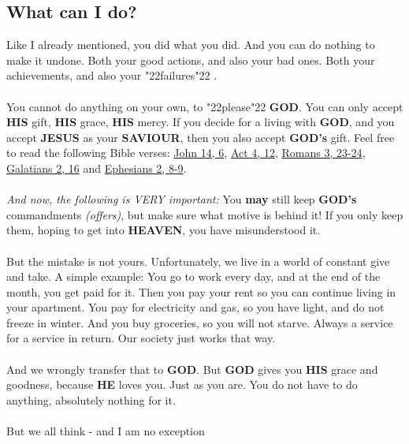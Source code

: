 \documentclass[12pt,a5paper]{article}
\newcommand{\God}[0]{\textbf{GOD}}
\newcommand{\Gods}[0]{\textbf{GOD's}}
\newcommand{\He}[0]{\textbf{HE}}
\newcommand{\Heaven}[0]{\textbf{HEAVEN}}
\newcommand{\His}[0]{\textbf{HIS}}
\newcommand{\Jesus}[0]{\textbf{JESUS}}
\newcommand{\Saviour}[0]{\textbf{SAVIOUR}}
\newcommand{\q}[1]{\char"22{#1}\char"22 }
\begin{document}
	\subsection{What can I do?}
		Like I already mentioned,
		you did what you did.
		And you can do nothing to make it undone.
		Both your good actions,
		and also your bad ones.
		Both your achievements,
		and also your \q{failures}.
		\\
		\\
		You cannot do anything on your own,
		to \q{please} {\God}.
		You can only accept {\His} gift,
		{\His} grace,
		{\His} mercy.
		If you decide for a living with {\God},
		and you accept {\Jesus} as your {\Saviour},
		then you also accept {\Gods} gift.
		Feel free to read the following Bible verses:
		\href{https://www.die-bibel.de/bibeln/online-bibeln/lesen/ESV/JHN.14/John-14}{John 14, 6},
		\href{https://www.die-bibel.de/bibeln/online-bibeln/lesen/ESV/ACT.4/Acts-4}{Act 4, 12},
		\href{https://www.die-bibel.de/bibeln/online-bibeln/lesen/ESV/ROM.3/Romans-3}{Romans 3, 23-24},
		\href{https://www.die-bibel.de/bibeln/online-bibeln/lesen/ESV/GAL.2}{Galatians 2, 16} and \href{https://www.die-bibel.de/bibeln/online-bibeln/lesen/ESV/EPH.2/Ephesians-2}{Ephesians 2, 8-9}.
		\\
		\\
		\textit{And now, the following is VERY important:}
		You \textbf{may} still keep {\Gods} commandments \textit{(offers)},
		but make sure what motive is behind it!
		If you only keep them,
		hoping to get into {\Heaven},
		you have misunderstood it.
		\\
		\\
		But the mistake is not yours.
		Unfortunately,
		we live in a world of constant give and take.
		A simple example:
		You go to work every day,
		and at the end of the month,
		you get paid for it.
		Then you pay your rent so you can continue living in your apartment.
		You pay for electricity and gas,
		so you have light,
		and do not freeze in winter.
		And you buy groceries,
		so you will not starve.
		Always a service for a service in return.
		Our society just works that way.
		\\
		\\
		And we wrongly transfer that to {\God}.
		But {\God} gives you {\His} grace and goodness,
		because {\He} loves you.
		Just as you are.
		You do not have to do anything,
		absolutely nothing for it.
		\\
		\\
		But we all think
		- and I am no exception
\end{document}

